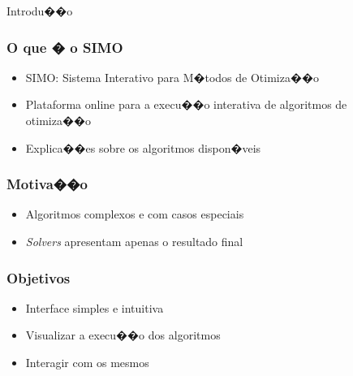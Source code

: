 \documentclass[handout]{beamer}
\begin{document}
\begin{section}{Introdu��o}

\begin{frame}\frametitle{O que � o SIMO}
	\begin{itemize}
		\item SIMO: Sistema Interativo para M�todos de Otimiza��o
		\bigskip
		\item Plataforma online para a execu��o interativa de algoritmos de otimiza��o
		\bigskip
		\item Explica��es sobre os algoritmos dispon�veis
	\end{itemize}
\end{frame}

\begin{frame}\frametitle{Motiva��o}
	\begin{itemize}
		\item Algoritmos complexos e com casos especiais
		\bigskip
		\item \textit{Solvers} apresentam apenas o resultado final
	\end{itemize}
\end{frame}

\begin{frame}\frametitle{Objetivos}
	\begin{itemize}
		\item Interface simples e intuitiva
		\bigskip
		\item Visualizar a execu��o dos algoritmos
		\bigskip
		\item Interagir com os mesmos
	\end{itemize}
\end{frame}

\end{section}
\end{document}
